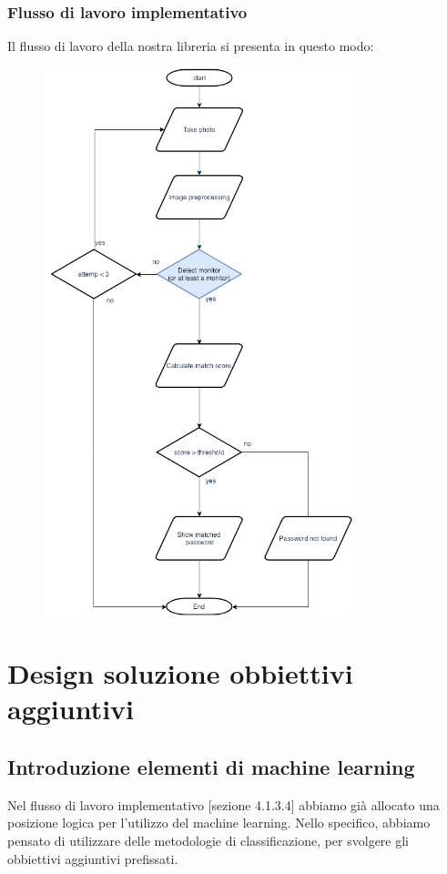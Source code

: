 \documentclass[twoside]{supsistudent}
\newcommand{\Decaa}{\newline\vspace{0.5mm}\newline\noindent}
\begin{document}
\subsubsection{Flusso di lavoro implementativo}
Il flusso di lavoro della nostra libreria si presenta in questo modo:
\begin{figure}[h!]
  \centering
    \includegraphics[width=0.8\textwidth]{Pictures/flusso1.png}
\end{figure}
\newline

\section{Design soluzione obbiettivi aggiuntivi}
\subsection{Introduzione elementi di machine learning}
Nel flusso di lavoro implementativo [sezione 4.1.3.4] abbiamo già allocato una posizione logica per l'utilizzo del machine learning.
\Decaa
Nello specifico, abbiamo pensato di utilizzare delle metodologie di classificazione, per svolgere gli obbiettivi aggiuntivi prefissati.
\end{document}
